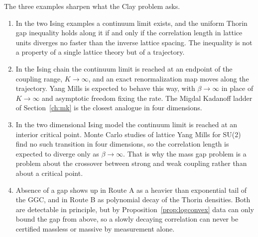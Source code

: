The three examples sharpen what the Clay problem asks.
\begin{enumerate}
\item[(i)] In the two Ising examples a continuum limit exists, and the uniform Thorin gap inequality holds along it if and only if the correlation length in lattice units diverges no faster than the inverse lattice spacing. The inequality is not a property of a single lattice theory but of a trajectory.
\item[(ii)] In the Ising chain the continuum limit is reached at an endpoint of the coupling range, $K\to\infty$, and an exact renormalization map moves along the trajectory. Yang Mills is expected to behave this way, with $\beta\to\infty$ in place of $K\to\infty$ and asymptotic freedom fixing the rate. The Migdal Kadanoff ladder of Section~\ref{ch:mk} is the closest analogue in four dimensions.
\item[(iii)] In the two dimensional Ising model the continuum limit is reached at an interior critical point. Monte Carlo studies of lattice Yang Mills for SU(2)~\cite{Cr80} find no such transition in four dimensions, so the correlation length is expected to diverge only as $\beta\to\infty$. That is why the mass gap problem is a problem about the crossover between strong and weak coupling rather than about a critical point.
\item[(iv)] Absence of a gap shows up in Route A as a heavier than exponential tail of the GGC, and in Route B as polynomial decay of the Thorin densities. Both are detectable in principle, but by Proposition~\ref{prop:logconvex} data can only bound the gap from above, so a slowly decaying correlation can never be certified massless or massive by measurement alone.
\end{enumerate}

